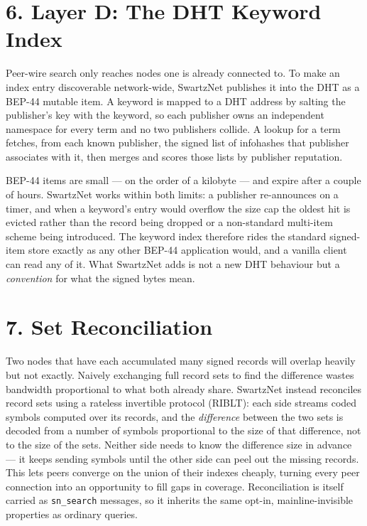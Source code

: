 \documentclass[11pt]{article}
\begin{document}
\hypertarget{layer-d-the-dht-keyword-index}{%
\section{6. Layer D: The DHT Keyword
Index}\label{layer-d-the-dht-keyword-index}}

Peer-wire search only reaches nodes one is already connected to. To make
an index entry discoverable network-wide, SwartzNet publishes it into
the DHT as a BEP-44 mutable item. A keyword is mapped to a DHT address
by salting the publisher's key with the keyword, so each publisher owns
an independent namespace for every term and no two publishers collide. A
lookup for a term fetches, from each known publisher, the signed list of
infohashes that publisher associates with it, then merges and scores
those lists by publisher reputation.

BEP-44 items are small --- on the order of a kilobyte --- and expire
after a couple of hours. SwartzNet works within both limits: a publisher
re-announces on a timer, and when a keyword's entry would overflow the
size cap the oldest hit is evicted rather than the record being dropped
or a non-standard multi-item scheme being introduced. The keyword index
therefore rides the standard signed-item store exactly as any other
BEP-44 application would, and a vanilla client can read any of it. What
SwartzNet adds is not a new DHT behaviour but a \emph{convention} for
what the signed bytes mean.

\hypertarget{set-reconciliation}{%
\section{7. Set Reconciliation}\label{set-reconciliation}}

Two nodes that have each accumulated many signed records will overlap
heavily but not exactly. Naively exchanging full record sets to find the
difference wastes bandwidth proportional to what both already share.
SwartzNet instead reconciles record sets using a rateless invertible
protocol (RIBLT): each side streams coded symbols computed over its
records, and the \emph{difference} between the two sets is decoded from
a number of symbols proportional to the size of that difference, not to
the size of the sets. Neither side needs to know the difference size in
advance --- it keeps sending symbols until the other side can peel out
the missing records. This lets peers converge on the union of their
indexes cheaply, turning every peer connection into an opportunity to
fill gaps in coverage. Reconciliation is itself carried as
\texttt{sn\_search} messages, so it inherits the same opt-in,
mainline-invisible properties as ordinary queries.
\end{document}
